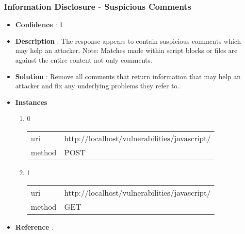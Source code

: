 \documentclass[10pt]{article}
\begin{document}
\subsubsection{Information Disclosure - Suspicious Comments}
\begin{itemize}
\item[] \textbf{Confidence} : 1
\item[] \textbf{Description} : The response appears to contain suspicious comments which may help an attacker. Note: Matches made within script blocks or files are against the entire content not only comments.
\item[] \textbf{Solution} :  Remove all comments that return information that may help an attacker and fix any underlying problems they refer to.
\item[] \textbf{Instances}
\begin{enumerate}
\item[] 0
\begin{tabular}{| l | p{12cm}}
uri & http://localhost/vulnerabilities/javascript/ \\
method & POST \\
\end{tabular}
\item[] 1
\begin{tabular}{| l | p{12cm}}
uri & http://localhost/vulnerabilities/javascript/ \\
method & GET \\
\end{tabular}
\end{enumerate}
\item[] \textbf{Reference} : 
\end{itemize}
\end{document}
